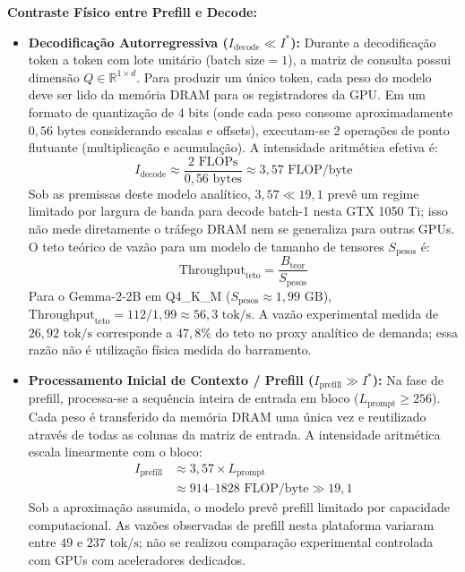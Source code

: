 \documentclass[10pt,a4paper,twocolumn]{article}
\begin{document}
\textbf{Contraste F\'isico entre Prefill e Decode:}
\begin{itemize}[leftmargin=1.5em,itemsep=0.2em]
    \item \textbf{Decodifica\c{c}\~ao Autorregressiva ($I_{\text{decode}} \ll I^*$):} Durante a decodifica\c{c}\~ao token a token com lote unit\'ario ($\text{batch size} = 1$), a matriz de consulta possui dimens\~ao $Q \in \mathbb{R}^{1 \times d}$. Para produzir um \'unico token, cada peso do modelo deve ser lido da mem\'oria DRAM para os registradores da GPU. Em um formato de quantiza\c{c}\~ao de 4 bits (onde cada peso consome aproximadamente $0,56\text{ bytes}$ considerando escalas e offsets), executam-se 2 opera\c{c}\~oes de ponto flutuante (multiplica\c{c}\~ao e acumula\c{c}\~ao). A intensidade aritm\'etica efetiva \'e:
    \begin{equation}
    I_{\text{decode}} \approx \frac{2\text{ FLOPs}}{0,56\text{ bytes}} \approx 3,57\text{ FLOP/byte}
    \end{equation}
    Sob as premissas deste modelo anal\'itico, $3,57 \ll 19,1$ prev\^e um regime limitado por largura de banda para decode batch-1 nesta GTX 1050 Ti; isso n\~ao mede diretamente o tr\'afego DRAM nem se generaliza para outras GPUs. O teto te\'orico de vaz\~ao para um modelo de tamanho de tensores $S_{\text{pesos}}$ \'e:
    \begin{equation}
    \text{Throughput}_{\text{teto}} = \frac{B_{\text{teor}}}{S_{\text{pesos}}}
    \end{equation}
    Para o Gemma-2-2B em Q4\_K\_M ($S_{\text{pesos}} \approx 1,99\text{ GB}$), $\text{Throughput}_{\text{teto}} = 112 / 1,99 \approx 56,3\text{ tok/s}$. A vaz\~ao experimental medida de $26,92\text{ tok/s}$ corresponde a $47,8\%$ do teto no proxy anal\'itico de demanda; essa raz\~ao n\~ao \'e utiliza\c{c}\~ao f\'isica medida do barramento.
    \item \textbf{Processamento Inicial de Contexto / Prefill ($I_{\text{prefill}} \gg I^*$):} Na fase de prefill, processa-se a sequ\^encia inteira de entrada em bloco ($L_{\text{prompt}} \ge 256$). Cada peso \'e transferido da mem\'oria DRAM uma \'unica vez e reutilizado atrav\'es de todas as colunas da matriz de entrada. A intensidade aritm\'etica escala linearmente com o bloco:
    \begin{equation}
    \begin{aligned}
    I_{\text{prefill}} &\approx 3,57 \times L_{\text{prompt}}\\
    &\approx 914\text{--}1828\text{ FLOP/byte} \gg 19,1
    \end{aligned}
    \end{equation}
    Sob a aproxima\c{c}\~ao assumida, o modelo prev\^e prefill limitado por capacidade computacional. As vaz\~oes observadas de prefill nesta plataforma variaram entre $49$ e $237\text{ tok/s}$; n\~ao se realizou compara\c{c}\~ao experimental controlada com GPUs com aceleradores dedicados.
\end{itemize}
\end{document}

